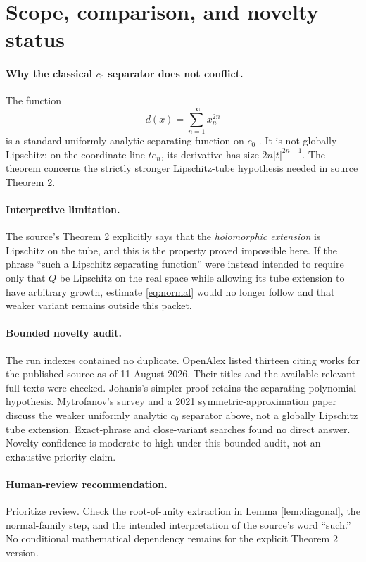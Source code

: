 \documentclass[11pt]{article}
\begin{document}
\section{Scope, comparison, and novelty status}

\paragraph{Why the classical $c_0$ separator does not conflict.}
The function
\[
 d(x)=\sum_{n=1}^\infty x_n^{2n}
\]
is a standard uniformly analytic separating function on $c_0$
\cite{BoisoHajek,Mytrofanov}.  It is not globally Lipschitz: on the coordinate
line $te_n$, its derivative has size $2n|t|^{2n-1}$.  The theorem concerns the
strictly stronger Lipschitz-tube hypothesis needed in source Theorem 2.

\paragraph{Interpretive limitation.}
The source's Theorem 2 explicitly says that the \emph{holomorphic extension}
is Lipschitz on the tube, and this is the property proved impossible here.
If the phrase ``such a Lipschitz separating function'' were instead intended
to require only that $Q$ be Lipschitz on the real space while allowing its
tube extension to have arbitrary growth, estimate \eqref{eq:normal} would no
longer follow and that weaker variant remains outside this packet.

\paragraph{Bounded novelty audit.}
The run indexes contained no duplicate.  OpenAlex listed thirteen citing
works for the published source as of 11 August 2026.  Their titles and the
available relevant full texts were checked.  Johanis's simpler proof
\cite{Johanis} retains the separating-polynomial hypothesis.  Mytrofanov's
survey \cite{Mytrofanov} and a 2021 symmetric-approximation paper discuss the
weaker uniformly analytic $c_0$ separator above, not a globally Lipschitz tube
extension.  Exact-phrase and close-variant searches found no direct answer.
Novelty confidence is moderate-to-high under this bounded audit, not an
exhaustive priority claim.

\paragraph{Human-review recommendation.}
Prioritize review.  Check the root-of-unity extraction in Lemma
\ref{lem:diagonal}, the normal-family step, and the intended interpretation of
the source's word ``such.''  No conditional mathematical dependency remains
for the explicit Theorem 2 version.
\end{document}
